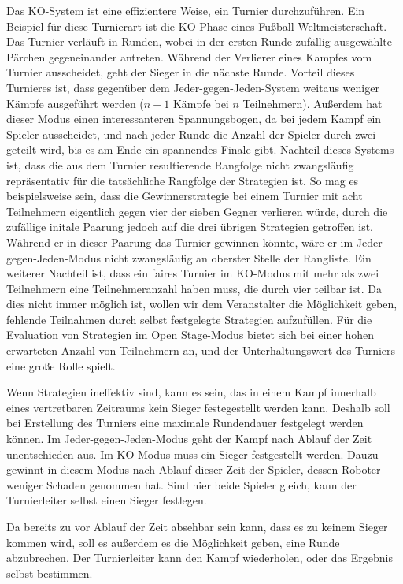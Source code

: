 Das KO-System ist eine effizientere Weise, ein Turnier durchzuführen. Ein Beispiel für diese
Turnierart ist die KO-Phase eines Fußball-Weltmeisterschaft. Das Turnier verläuft in Runden, wobei
in der ersten Runde zufällig ausgewählte Pärchen gegeneinander antreten. Während der Verlierer eines
Kampfes vom Turnier ausscheidet, geht der Sieger in die nächste Runde. Vorteil dieses Turnieres ist,
dass gegenüber dem Jeder-gegen-Jeden-System weitaus weniger Kämpfe ausgeführt werden ($n - 1$ Kämpfe
bei $n$ Teilnehmern). Außerdem hat dieser Modus einen interessanteren Spannungsbogen, da bei jedem
Kampf ein Spieler ausscheidet, und nach jeder Runde die Anzahl der Spieler durch zwei geteilt wird,
bis es am Ende ein spannendes Finale gibt. Nachteil dieses Systems ist, dass die aus dem Turnier
resultierende Rangfolge nicht zwangsläufig repräsentativ für die tatsächliche Rangfolge der
Strategien ist. So mag es beispielsweise sein, dass die Gewinnerstrategie bei einem Turnier mit acht
Teilnehmern eigentlich gegen vier der sieben Gegner verlieren würde, durch die zufällige initale
Paarung jedoch auf die drei übrigen Strategien getroffen ist. Während er in dieser Paarung das
Turnier gewinnen könnte, wäre er im Jeder-gegen-Jeden-Modus nicht zwangsläufig an oberster Stelle
der Rangliste. Ein weiterer Nachteil ist, dass ein faires Turnier im KO-Modus mit mehr als zwei
Teilnehmern eine Teilnehmeranzahl haben muss, die durch vier teilbar ist. Da dies nicht immer
möglich ist, wollen wir dem Veranstalter die Möglichkeit geben, fehlende Teilnahmen durch selbst
festgelegte Strategien aufzufüllen. Für die Evaluation von Strategien im Open Stage-Modus bietet
sich bei einer hohen erwarteten Anzahl von Teilnehmern an, und der Unterhaltungswert des Turniers
eine große Rolle spielt. 

Wenn Strategien ineffektiv sind, kann es sein, das in einem Kampf innerhalb eines vertretbaren
Zeitraums kein Sieger festegestellt werden kann. Deshalb soll bei Erstellung des Turniers eine
maximale Rundendauer festgelegt werden können. Im Jeder-gegen-Jeden-Modus geht der Kampf nach Ablauf
der Zeit unentschieden aus. Im KO-Modus muss ein Sieger festgestellt werden. Dauzu gewinnt in
diesem Modus nach Ablauf dieser Zeit der Spieler, dessen Roboter weniger Schaden genommen hat. Sind
hier beide Spieler gleich, kann der Turnierleiter selbst einen Sieger festlegen.

Da bereits zu vor Ablauf der Zeit absehbar sein kann, dass es zu keinem Sieger kommen wird, soll es
außerdem es die Möglichkeit geben, eine Runde abzubrechen. Der Turnierleiter kann den Kampf
wiederholen, oder das Ergebnis selbst bestimmen.

